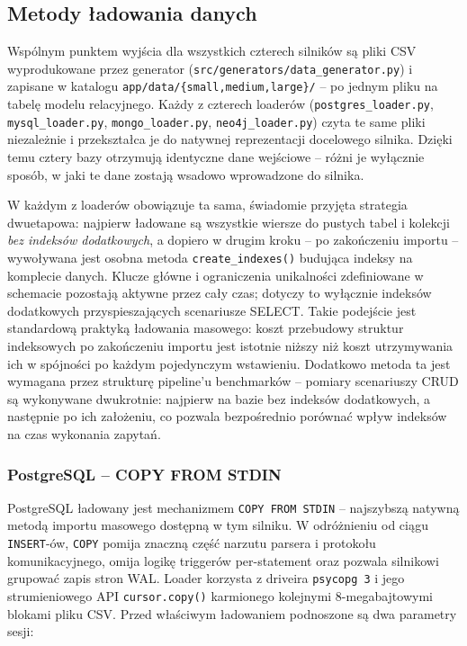 \subsection{Metody ładowania danych}

Wspólnym punktem wyjścia dla wszystkich czterech silników są pliki CSV
wyprodukowane przez generator (\texttt{src/generators/data\_generator.py})
i zapisane w katalogu \texttt{app/data/\{small,medium,large\}/} -- po
jednym pliku na tabelę modelu relacyjnego. Każdy z czterech loaderów
(\texttt{postgres\_loader.py}, \texttt{mysql\_loader.py}, \texttt{mongo\_loader.py},
\texttt{neo4j\_loader.py}) czyta te same pliki niezależnie i przekształca je
do natywnej reprezentacji docelowego silnika. Dzięki temu cztery bazy
otrzymują identyczne dane wejściowe -- różni je wyłącznie sposób, w jaki
te dane zostają wsadowo wprowadzone do silnika.

W każdym z loaderów obowiązuje ta sama, świadomie przyjęta strategia
dwuetapowa: najpierw ładowane są wszystkie wiersze do pustych tabel
i kolekcji \emph{bez indeksów dodatkowych}, a dopiero w drugim kroku -- po
zakończeniu importu -- wywoływana jest osobna metoda \texttt{create\_indexes()}
budująca indeksy na komplecie danych. Klucze główne i ograniczenia
unikalności zdefiniowane w schemacie pozostają aktywne przez cały czas;
dotyczy to wyłącznie indeksów dodatkowych przyspieszających scenariusze SELECT.
Takie podejście jest standardową praktyką ładowania masowego: koszt
przebudowy struktur indeksowych po zakończeniu importu jest istotnie
niższy niż koszt utrzymywania ich w spójności po każdym pojedynczym
wstawieniu. Dodatkowo metoda ta jest wymagana przez strukturę pipeline'u
benchmarków -- pomiary scenariuszy CRUD są wykonywane dwukrotnie:
najpierw na bazie bez indeksów dodatkowych, a następnie po ich założeniu,
co pozwala bezpośrednio porównać wpływ indeksów na czas wykonania
zapytań.

\subsubsection*{PostgreSQL -- COPY FROM STDIN}

PostgreSQL ładowany jest mechanizmem \texttt{COPY FROM STDIN} -- najszybszą
natywną metodą importu masowego dostępną w tym silniku. W odróżnieniu
od ciągu \texttt{INSERT}-ów, \texttt{COPY} pomija znaczną część narzutu
parsera i protokołu komunikacyjnego, omija logikę triggerów per-statement
oraz pozwala silnikowi grupować zapis stron WAL. Loader korzysta
z driveira \texttt{psycopg~3} i jego strumieniowego API \texttt{cursor.copy()}
karmionego kolejnymi 8-megabajtowymi blokami pliku CSV. Przed właściwym
ładowaniem podnoszone są dwa parametry sesji:

